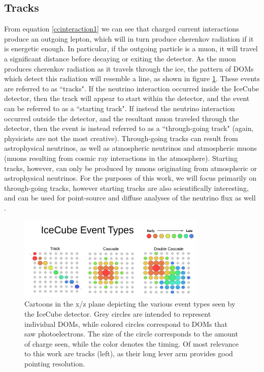 \subsection{Tracks}
From equation \ref{ccinteraction1} we can see that charged current interactions produce an outgoing lepton, which will in turn produce cherenkov radiation if it is energetic enough. In particular, if the outgoing particle is a muon, it will travel a significant distance before decaying or exiting the detector. As the muon produces cherenkov radiation as it travels through the ice, the pattern of DOMs which detect this radiation will resemble a line, as shown in figure \ref{fig:evttypes}. These events are referred to as ``tracks". If the neutrino interaction occurred inside the IceCube detector, then the track will appear to start within the detector, and the event can be referred to as a ``starting track". If instead the neutrino interaction occurred outside the detector, and the resultant muon traveled through the detector, then the event is instead referred to as a ``through-going track" (again, physicists are not the most creative). Through-going tracks can result from astrophysical neutrinos, as well as atmospheric neutrinos and atmospheric muons (muons resulting from cosmic ray interactions in the atmosphere). Starting tracks, however, can only be produced by muons originating from atmospheric or astrophysical neutrinos. For the purposes of this work, we will focus primarily on through-going tracks, however starting tracks are also scientifically interesting, and can be used for point-source and diffuse analyses of the neutrino flux as well \cite{Estes}.

\begin{figure}[h]
\centering
\includegraphics[width=0.8\textwidth]{figs/evt_types.png}
\caption{Cartoons in the x/z plane depicting the various event types seen by the IceCube detector. Grey circles are intended to represent individual DOMs, while colored circles correspond to DOMs that saw photoelectrons. The size of the circle corresponds to the amount of charge seen, while the color denotes the timing. Of most relevance to this work are tracks (left), as their long lever arm provides good pointing resolution.}
\label{fig:evttypes}
\end{figure}


